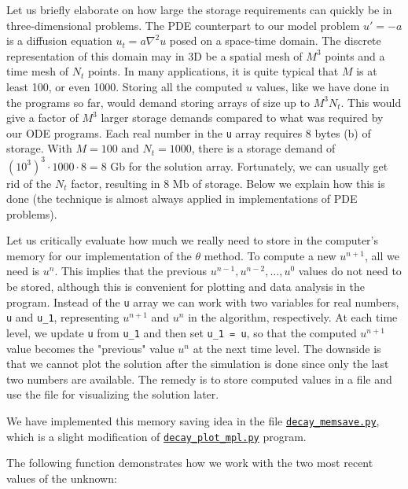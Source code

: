 \documentclass[%
oneside,                 %
final,                   %
10pt]{article}
\begin{document}
Let us briefly elaborate on how large the storage requirements can
quickly be in three-dimensional problems.  The PDE counterpart to our
model problem $u'=-a$ is a diffusion equation $u_t = a\nabla^2 u$
posed on a space-time domain. The discrete representation of this
domain may in 3D be a spatial mesh of $M^3$ points and a time mesh of
$N_t$ points.  In many applications, it is quite typical that $M$ is
at least 100, or even 1000.  Storing all the computed $u$ values, like
we have done in the programs so far, would demand storing arrays of
size up to $M^3N_t$. This would give a factor of $M^3$ larger storage
demands compared to what was required by our ODE programs. Each real
number in the \texttt{u} array requires 8 bytes (b) of storage. With $M=100$
and $N_t=1000$, there is a storage demand of $(10^3)^3\cdot 1000\cdot
8 = 8$ Gb for the solution array.  Fortunately, we can usually get rid
of the $N_t$ factor, resulting in 8 Mb of storage.  Below we explain
how this is done (the technique is almost always applied in
implementations of PDE problems).


Let us critically evaluate how much we really need to store in the
computer's memory for our implementation of the $\theta$ method. To
compute a new $u^{n+1}$, all we need is $u^n$. This implies that the
previous $u^{n-1},u^{n-2},\dots,u^0$ values do not need to be stored,
although this is convenient for plotting and data analysis in the
program.  Instead of the \texttt{u} array we can work with two variables for
real numbers, \texttt{u} and \Verb!u_1!, representing $u^{n+1}$ and $u^n$ in the
algorithm, respectively.  At each time level, we update \texttt{u} from \Verb!u_1!
and then set \Verb!u_1 = u!, so that the computed $u^{n+1}$ value becomes
the "previous" value $u^n$ at the next time level. The downside is
that we cannot plot the solution after the simulation is done since
only the last two numbers are available.  The remedy is to store
computed values in a file and use the file for visualizing the
solution later.

We have implemented this memory saving idea in the file
\href{{http://tinyurl.com/ofkw6kc/alg/decay_memsave.py}}{\nolinkurl{decay_memsave.py}}, which is a
slight modification of \href{{http://tinyurl.com/ofkw6kc/alg/decay_plot_mpl.py}}{\nolinkurl{decay_plot_mpl.py}} program.

The following function demonstrates how we work with the two most
recent values of the unknown:
\end{document}
